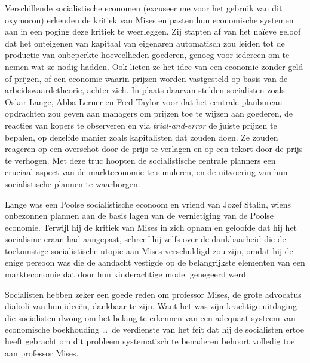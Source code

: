 Verschillende socialistische economen (excuseer me voor het gebruik van dit oxymoron) erkenden de kritiek van Mises en pasten hun economische systemen aan in een poging deze kritiek te weerleggen. Zij stapten af van het naïeve geloof dat het onteigenen van kapitaal van eigenaren automatisch zou leiden tot de productie van onbeperkte hoeveelheden goederen, genoeg voor iedereen om te nemen wat ze nodig hadden. Ook lieten ze het idee van een economie zonder geld of prijzen, of een economie waarin prijzen worden vastgesteld op basis van de arbeidswaardetheorie, achter zich. In plaats daarvan stelden socialisten zoals Oskar Lange, Abba Lerner en Fred Taylor voor dat het centrale planbureau opdrachten zou geven aan managers om prijzen toe te wijzen aan goederen, de reacties van kopers te observeren en via \emph{trial-and-error} de juiste prijzen te bepalen, op dezelfde manier zoals kapitalisten dat zouden doen. Ze zouden reageren op een overschot door de prijs te verlagen en op een tekort door de prijs te verhogen. Met deze truc hoopten de socialistische centrale planners een cruciaal aspect van de markteconomie te simuleren, en de uitvoering van hun socialistische plannen te waarborgen.

Lange was een Poolse socialistische econoom en vriend van Jozef Stalin, wiens onbezonnen plannen aan de basis lagen van de vernietiging van de Poolse economie. Terwijl hij de kritiek van Mises in zich opnam en geloofde dat hij het socialisme eraan had aangepast, schreef hij zelfs over de dankbaarheid die de toekomstige socialistische utopie aan Mises verschuldigd zou zijn, omdat hij de enige persoon was die de aandacht vestigde op de belangrijkste elementen van een markteconomie dat door hun kinderachtige model genegeerd werd.

\begin{blockquotebox}
    Socialisten hebben zeker een goede reden om professor Mises, de grote advocatus diaboli van hun ideeën, dankbaar te zijn. Want het was zijn krachtige uitdaging die socialisten dwong om het belang te erkennen van een adequaat systeem van economische boekhouding \ldots ~de verdienste van het feit dat hij de socialisten ertoe heeft gebracht om dit probleem systematisch te benaderen behoort volledig toe aan professor Mises.\footnotemark
\end{blockquotebox}

